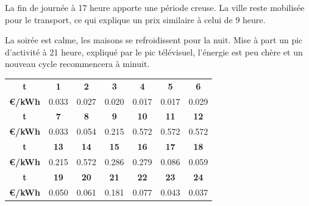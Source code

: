 La fin de journée à 17 heure apporte une période creuse. La ville reste mobilisée pour le transport, ce qui explique
un prix similaire à celui de 9 heure.

La soirée est calme, les maisons se refroidissent pour la nuit. Mise à part un pic d'activité à 21 heure, expliqué par le
pic télévisuel, l'énergie est peu chère et un nouveau cycle recommencera à minuit.

\begin{tabular}{ | c | c | c | c | c | c | c | }
  \hline
  \textbf{t} & \textbf{1} & \textbf{2} & \textbf{3} & \textbf{4} & \textbf{5} & \textbf{6} \\
  \textbf{€/kWh} & 0.033 & 0.027 & 0.020 & 0.017 & 0.017 & 0.029 \\
  \hline
  \textbf{t} & \textbf{7} & \textbf{8} & \textbf{9} & \textbf{10} & \textbf{11} & \textbf{12} \\
  \textbf{€/kWh} & 0.033 & 0.054 & 0.215 & 0.572 & 0.572 & 0.572 \\
  \hline
  \textbf{t} & \textbf{13} & \textbf{14} & \textbf{15} & \textbf{16} & \textbf{17} & \textbf{18} \\
  \textbf{€/kWh} & 0.215 & 0.572 & 0.286 & 0.279 & 0.086 & 0.059 \\
  \hline
  \textbf{t} & \textbf{19} & \textbf{20} & \textbf{21} & \textbf{22} & \textbf{23} & \textbf{24} \\
  \textbf{€/kWh} & 0.050 & 0.061 & 0.181 & 0.077 & 0.043 & 0.037 \\
  \hline
\end{tabular}



